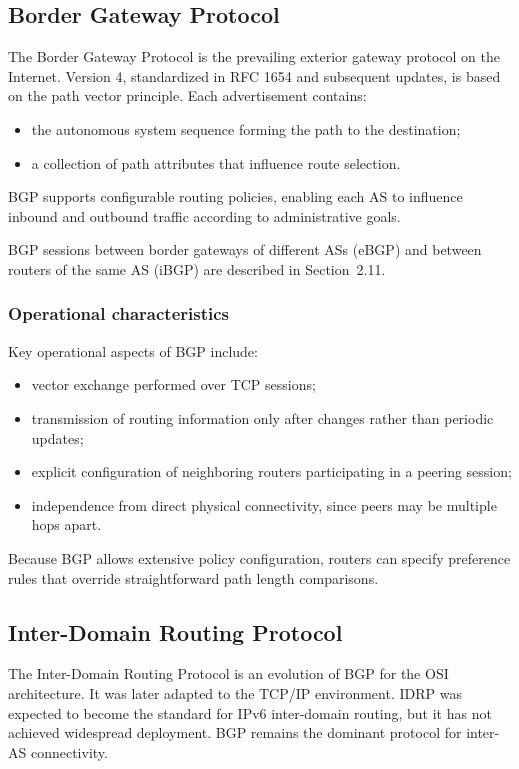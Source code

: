 \subsection{Border Gateway Protocol}

The Border Gateway Protocol is the prevailing exterior gateway protocol on the Internet. Version 4, standardized in RFC 1654 and subsequent updates, is based on the path vector principle. Each advertisement contains:

\begin{itemize}
\item the autonomous system sequence forming the path to the destination;
\item a collection of path attributes that influence route selection.
\end{itemize}


\begin{center}
\end{center}

BGP supports configurable routing policies, enabling each AS to influence inbound and outbound traffic according to administrative goals.

BGP sessions between border gateways of different ASs (eBGP) and between routers
of the same AS (iBGP) are described in Section~2.11.

\subsubsection*{Operational characteristics}

Key operational aspects of BGP include:

\begin{itemize}
\item vector exchange performed over TCP sessions;
\item transmission of routing information only after changes rather than periodic updates;
\item explicit configuration of neighboring routers participating in a peering session;
\item independence from direct physical connectivity, since peers may be multiple hops apart.
\end{itemize}

Because BGP allows extensive policy configuration, routers can specify preference rules that override straightforward path length comparisons.

\subsection{Inter-Domain Routing Protocol}

The Inter-Domain Routing Protocol is an evolution of BGP for the OSI architecture. It was later adapted to the TCP/IP environment. IDRP was expected to become the standard for IPv6 inter-domain routing, but it has not achieved widespread deployment. BGP remains the dominant protocol for inter-AS connectivity.

